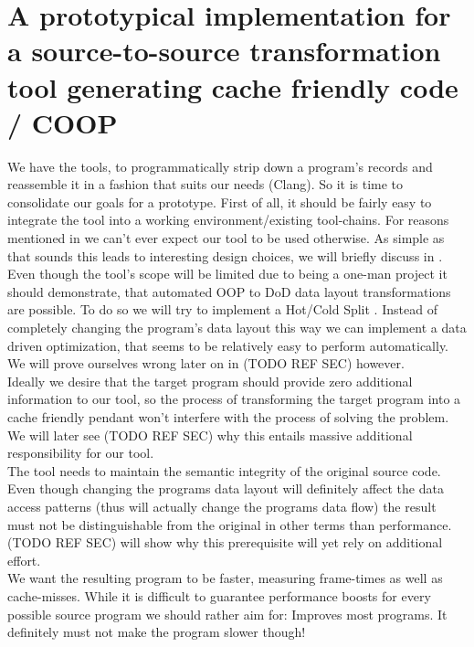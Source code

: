 \chapter{A prototypical implementation for a source-to-source transformation tool generating cache friendly code / COOP}
We have the tools, to programmatically strip down a program's records and reassemble it in a fashion that suits our needs (Clang). So it is time to consolidate our goals for a prototype. First of all, it should be fairly easy to integrate the tool into a working environment/existing tool-chains. For reasons mentioned in  we can't ever expect our tool to be used otherwise. As simple as that sounds this leads to interesting design choices, we will briefly discuss in .\\
Even though the tool's scope will be limited due to being a one-man project it should demonstrate, that automated OOP to DoD data layout transformations are possible. To do so we will try to implement a Hot/Cold Split . Instead of completely changing the program's data layout this way we can implement a data driven optimization, that seems to be relatively easy to perform automatically. We will prove ourselves wrong later on in (TODO REF SEC) however.\\
Ideally we desire that the target program should provide zero additional information to our tool, so the process of transforming the target program into a cache friendly pendant won't interfere with the process of solving the problem. We will later see (TODO REF SEC) why this entails massive additional responsibility for our tool.\\
The tool needs to maintain the semantic integrity of the original source code. Even though changing the programs data layout will definitely affect the data access patterns (thus will actually change the programs data flow) the result must not be distinguishable from the original in other terms than performance. (TODO REF SEC) will show why this prerequisite will yet rely on additional effort.\\
We want the resulting program to be faster, measuring frame-times as well as cache-misses. While it is difficult to guarantee performance boosts for every possible source program we should rather aim for: Improves most programs. It definitely must not make the program slower though! 
\newpage
